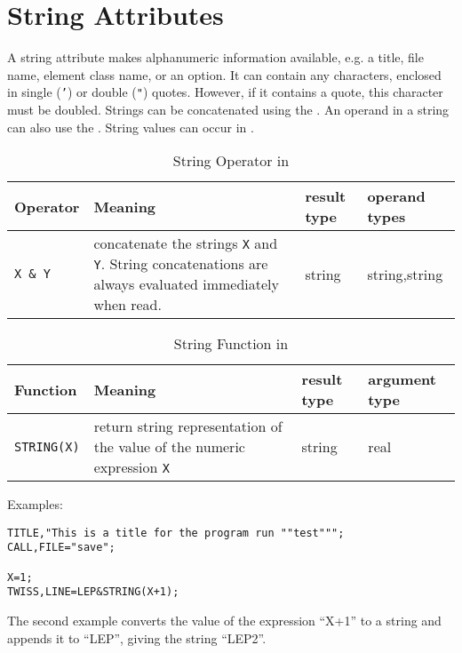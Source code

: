 \section{String Attributes}
\label{sec:astring}
A string attribute makes alphanumeric information available,
e.g. a title, file name, element class name, or an option.
It can contain any characters, enclosed in single (\texttt{'})
or double (\texttt{"}) quotes.
However, if it contains a quote, this character must be doubled.
Strings can be concatenated using the 
. 
An operand in a string can also use the 
. 
String values can occur in .

\begin{table}[ht] \footnotesize
   \begin{center}
    \caption{String Operator in \opal}
    \label{tab:stroperator}
    \begin{tabular}{|l|p{}|l|l|}
      \hline
      Operator & Meaning & result type & operand types \\
      \hline
      \texttt{X \& Y} & concatenate the strings \texttt{X} and \texttt{Y}.
      String concatenations are always evaluated immediately when read. &
      string &string,string \\
      \hline
    \end{tabular}
  \end{center}
\end{table}

\begin{table}[ht] \footnotesize
  \begin{center}
    \caption{String Function in \opal}
    \label{tab:stringfun}
    \begin{tabular}{|l|p{}|l|l|}
      \hline
      Function & Meaning & result type & argument type \\
      \hline
      \texttt{STRING(X)} &
      return string representation of the value
      of the numeric expression \texttt{X} &
      string &real \\
      \hline
    \end{tabular}
  \end{center}
\end{table}
\par
\noindent Examples:
\begin{verbatim}
TITLE,"This is a title for the program run ""test""";
CALL,FILE="save";

X=1;
TWISS,LINE=LEP&STRING(X+1);
\end{verbatim}
The second example converts the value of the expression ``X+1'' to a
string and appends it to ``LEP'', giving the string ``LEP2''.

